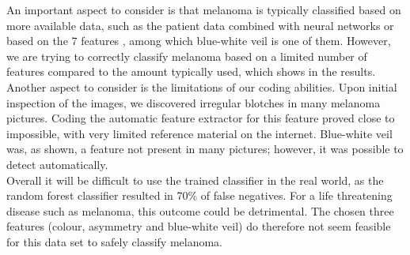 An important aspect to consider is that melanoma is typically classified based on more available data, such as the patient data combined with neural networks \cite{pacheco2020padufes} or based on the 7 features \cite{seven-pointchecklist}, among which blue-white veil is one of them. However, we are trying to correctly classify melanoma based on a limited number of features compared to the amount typically used, which shows in the results.\\
\newline
Another aspect to consider is the limitations of our coding abilities. Upon initial inspection of the images, we discovered irregular blotches in many melanoma pictures. Coding the automatic feature extractor for this feature proved close to impossible, with very limited reference material on the internet. Blue-white veil was, as shown, a feature not present in many pictures; however, it was possible to detect automatically.\\
\newline
Overall it will be difficult to use the trained classifier in the real world, as the random forest classifier resulted in 70\% of false negatives. For a life threatening disease such as melanoma, this outcome could be detrimental. The chosen three features (colour, asymmetry and blue-white veil) do therefore not seem feasible for this data set to safely classify melanoma.